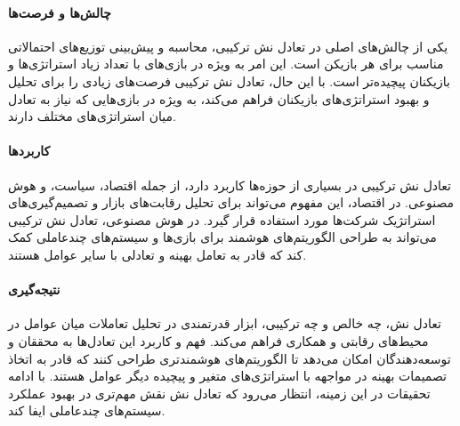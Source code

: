 \paragraph{چالش‌ها و فرصت‌ها}
یکی از چالش‌های اصلی در تعادل نش ترکیبی، محاسبه و پیش‌بینی توزیع‌های احتمالاتی مناسب برای هر بازیکن است. این امر به ویژه در بازی‌های با تعداد زیاد استراتژی‌ها و بازیکنان پیچیده‌تر است. با این حال، تعادل نش ترکیبی فرصت‌های زیادی را برای تحلیل و بهبود استراتژی‌های بازیکنان فراهم می‌کند، به ویژه در بازی‌هایی که نیاز به تعادل میان استراتژی‌های مختلف دارند.

\paragraph{کاربردها}
تعادل نش ترکیبی در بسیاری از حوزه‌ها کاربرد دارد، از جمله اقتصاد، سیاست، و هوش مصنوعی. در اقتصاد، این مفهوم می‌تواند برای تحلیل رقابت‌های بازار و تصمیم‌گیری‌های استراتژیک شرکت‌ها مورد استفاده قرار گیرد. در هوش مصنوعی، تعادل نش ترکیبی می‌تواند به طراحی الگوریتم‌های هوشمند برای بازی‌ها و سیستم‌های چندعاملی کمک کند که قادر به تعامل بهینه و تعادلی با سایر عوامل هستند.

\paragraph{نتیجه‌گیری}
تعادل نش، چه خالص و چه ترکیبی، ابزار قدرتمندی در تحلیل تعاملات میان عوامل در محیط‌های رقابتی و همکاری فراهم می‌کند. فهم و کاربرد این تعادل‌ها به محققان و توسعه‌دهندگان امکان می‌دهد تا الگوریتم‌های هوشمندتری طراحی کنند که قادر به اتخاذ تصمیمات بهینه در مواجهه با استراتژی‌های متغیر و پیچیده دیگر عوامل هستند. با ادامه تحقیقات در این زمینه، انتظار می‌رود که تعادل نش نقش مهم‌تری در بهبود عملکرد سیستم‌های چندعاملی ایفا کند.

